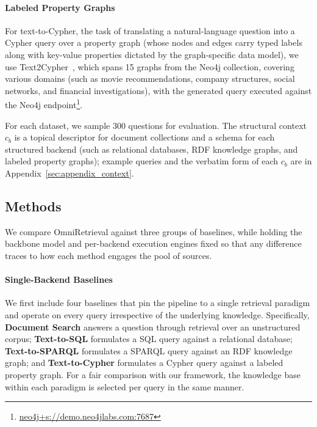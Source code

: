 \documentclass{llmxive}
\begin{document}
\vspace{-0.075in}
\paragraph{Labeled Property Graphs}
For text-to-Cypher, the task of translating a natural-language question into a Cypher query over a property graph (whose nodes and edges carry typed labels along with key-value properties dictated by the graph-specific data model), we use Text2Cypher~\citep{Text2Cypher}, which spans 15 graphs from the Neo4j collection, covering various domains (such as movie recommendations, company structures, social networks, and financial investigations), with the generated query executed against the Neo4j endpoint\footnote{\url{neo4j+s://demo.neo4jlabs.com:7687}}.

For each dataset, we sample 300 questions for evaluation. The structural context $c_b$ is a topical descriptor for document collections and a schema for each structured backend (such as relational databases, RDF knowledge graphs, and labeled property graphs); example queries and the verbatim form of each $c_b$ are in Appendix~\ref{sec:appendix_context}.

\subsection{Methods}

We compare OmniRetrieval against three groups of baselines, while holding the backbone model and per-backend execution engines fixed so that any difference traces to how each method engages the pool of sources.

\vspace{-0.025in}
\paragraph{Single-Backend Baselines}
We first include four baselines that pin the pipeline to a single retrieval paradigm and operate on every query irrespective of the underlying knowledge. Specifically, \textbf{Document Search} answers a question through retrieval over an unstructured corpus; \textbf{Text-to-SQL} formulates a SQL query against a relational database; \textbf{Text-to-SPARQL} formulates a SPARQL query against an RDF knowledge graph; and \textbf{Text-to-Cypher} formulates a Cypher query against a labeled property graph. For a fair comparison with our framework, the knowledge base within each paradigm is selected per query in the same manner.
\end{document}
